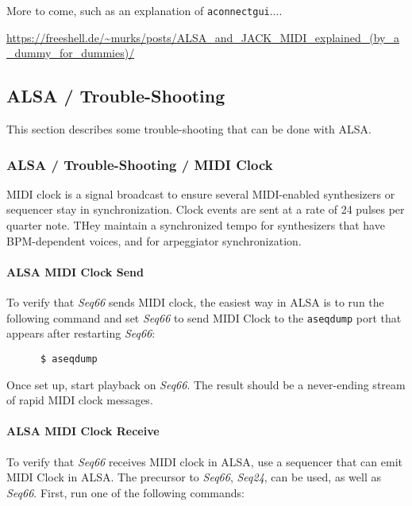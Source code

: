    More to come, such as an explanation of \texttt{aconnectgui}....

   \url{https://freeshell.de/~murks/posts/ALSA_and_JACK_MIDI_explained_(by_a_dummy_for_dummies)/}

\subsection{ALSA / Trouble-Shooting}
\label{subsec:alsa_testing}

   This section describes some trouble-shooting that can be done with ALSA.

\subsubsection{ALSA / Trouble-Shooting / MIDI Clock}
\label{subsubsec:alsa_testing_midi_clock}

   MIDI clock is a signal broadcast to ensure
   several MIDI-enabled synthesizers or sequencer stay in
   synchronization. Clock events are sent at a rate of 24 pulses per quarter
   note.  THey maintain a synchronized tempo for synthesizers
   that have BPM-dependent voices, and for arpeggiator synchronization.

\paragraph{ALSA MIDI Clock Send}
\label{paragraph:alsa_testing_midi_clock_send}

   To verify that \textsl{Seq66} sends MIDI clock, the easiest way in
   ALSA is to run the following command and set \textsl{Seq66} to send
   MIDI Clock to the \texttt{aseqdump} port that appears after restarting
   \textsl{Seq66}:

   \begin{verbatim}
      $ aseqdump
   \end{verbatim}

   Once set up, start playback on \textsl{Seq66}.
   The result should be a never-ending stream of rapid MIDI clock messages.

\paragraph{ALSA MIDI Clock Receive}
\label{paragraph:alsa_testing_midi_clock_receive}

   To verify that \textsl{Seq66} receives MIDI clock in ALSA, use a sequencer
   that can emit MIDI Clock in ALSA.  The precursor to \textsl{Seq66},
   \textsl{Seq24}, can be used, as well as \textsl{Seq66}.
   First, run one of the following commands:

